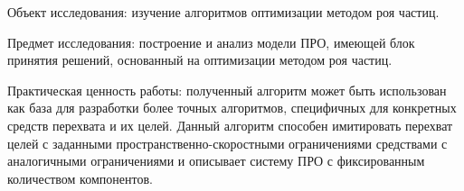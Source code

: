Объект исследования: изучение алгоритмов оптимизации методом роя частиц.

Предмет исследования: построение и анализ модели ПРО, имеющей блок принятия решений, основанный на оптимизации методом роя частиц.

Практическая ценность работы: полученный алгоритм может быть использован как база для разработки более точных алгоритмов, специфичных для конкретных средств перехвата и их целей. Данный алгоритм способен имитировать перехват целей с заданными пространственно-скоростными ограничениями средствами с аналогичными ограничениями и описывает систему ПРО с фиксированным количеством компонентов. 



 \newpage %
